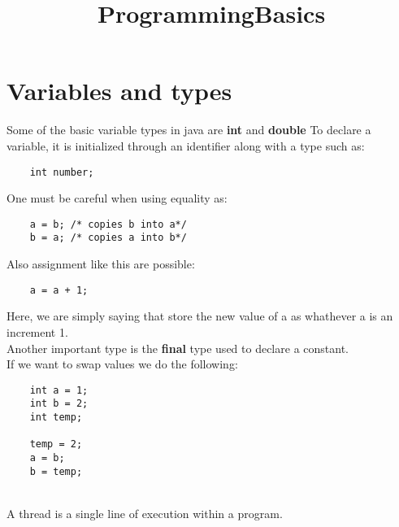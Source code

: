 \documentclass{article}
\date{\vspace{-5ex}}
\title{ProgrammingBasics}
\begin{document}
\maketitle

\section{Variables and types}
Some of the basic variable types in java are \textbf{int} and \textbf{double}
To declare a variable, it is initialized through an identifier along with a type such as:

\begin{verbatim}
    int number; 
\end{verbatim}

One must be careful when using equality as:
\begin{verbatim}
    a = b; /* copies b into a*/
    b = a; /* copies a into b*/
\end{verbatim}

Also assignment like this are possible:

\begin{verbatim}
    a = a + 1;
\end{verbatim}

Here, we are simply saying that store the new value of a as whathever a is an increment 1. 
\\
Another important type is the \textbf{final} type used to declare a constant. 
\\
If we want to swap values we do the following:
\begin{verbatim}
    int a = 1;
    int b = 2;
    int temp;
    
    temp = 2;
    a = b;
    b = temp;
\end{verbatim}
\\
A thread is a single line of execution within a program. 
\end{document}
